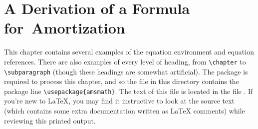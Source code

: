 
\newcommand\square{\vbox{\hrule{\hbox{\vrule height5pt\kern5pt\vrule}}\hrule}}
\newenvironment{finalsquare}%
  {\ifvmode\relax\else\par\fi\parfillskip=0pt}%
  {\linebreak[0]\hspace*{\fill}\square\par}


\chapter{A Derivation of a Formula for~Amortization}

This chapter contains several examples of the equation environment and
equation references.  There are also examples of every level of
heading, from \verb|\chapter| to \verb|\subparagraph| (though these
headings are somewhat artificial).  The  package is required
to process this chapter, and so the  file in this
directory contains the package line \verb|\usepackage{amsmath}|.
The text of this file is located in the file .
If you're new to \LaTeX, you may find it instructive to look at the
source text (which contains some extra documentation written as
\LaTeX{} comments) while reviewing this printed output.

